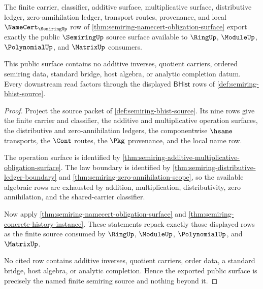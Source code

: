 \begin{theorem}
\label{thm:semiring-public-finite-source-export}
The finite carrier, classifier, additive surface, multiplicative surface, distributive ledger, zero-annihilation ledger, transport routes, provenance, and local $\NameCert_{\SemiringUp}$ row of \autoref{thm:semiring-namecert-obligation-surface} export exactly the public $\SemiringUp$ source surface available to $\RingUp$, $\ModuleUp$, $\PolynomialUp$, and $\MatrixUp$ consumers.

This public surface contains no additive inverses, quotient carriers, ordered semiring data, standard bridge, host algebra, or analytic completion datum. Every downstream read factors through the displayed $\mathsf{BHist}$ rows of \autoref{def:semiring-bhist-source}.
\end{theorem}
\begin{proof}
Project the source packet of \autoref{def:semiring-bhist-source}. Its nine rows give the finite carrier and classifier, the additive and multiplicative operation surfaces, the distributive and zero-annihilation ledgers, the componentwise $\hsame$ transports, the $\Cont$ routes, the $\Pkg$ provenance, and the local name row.

The operation surface is identified by \autoref{thm:semiring-additive-multiplicative-obligation-surface}. The law boundary is identified by \autoref{thm:semiring-distributive-ledger-boundary} and \autoref{thm:semiring-zero-annihilation-scope}, so the available algebraic rows are exhausted by addition, multiplication, distributivity, zero annihilation, and the shared-carrier classifier.

Now apply \autoref{thm:semiring-namecert-obligation-surface} and \autoref{thm:semiring-concrete-history-instance}. These statements repack exactly those displayed rows as the finite source consumed by $\RingUp$, $\ModuleUp$, $\PolynomialUp$, and $\MatrixUp$.

No cited row contains additive inverses, quotient carriers, order data, a standard bridge, host algebra, or analytic completion. Hence the exported public surface is precisely the named finite semiring source and nothing beyond it.
\end{proof}

